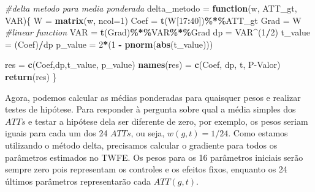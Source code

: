\documentclass[portugues]{article}
\newenvironment{Shaded}{\begin{snugshade}}{\end{snugshade}}
\newcommand{\AttributeTok}[1]{\textcolor[rgb]{0.13,0.29,0.53}{#1}}
\newcommand{\CommentTok}[1]{\textcolor[rgb]{0.56,0.35,0.01}{\textit{#1}}}
\newcommand{\ControlFlowTok}[1]{\textcolor[rgb]{0.13,0.29,0.53}{\textbf{#1}}}
\newcommand{\DecValTok}[1]{\textcolor[rgb]{0.00,0.00,0.81}{#1}}
\newcommand{\FunctionTok}[1]{\textcolor[rgb]{0.13,0.29,0.53}{\textbf{#1}}}
\newcommand{\NormalTok}[1]{#1}
\newcommand{\OtherTok}[1]{\textcolor[rgb]{0.56,0.35,0.01}{#1}}
\newcommand{\SpecialCharTok}[1]{\textcolor[rgb]{0.81,0.36,0.00}{\textbf{#1}}}
\newcommand{\StringTok}[1]{\textcolor[rgb]{0.31,0.60,0.02}{#1}}
\begin{document}
\begin{box_code}

\begin{Shaded}
\begin{Highlighting}[]
\CommentTok{\#delta metodo para media ponderada}
\NormalTok{delta\_metodo }\OtherTok{=} \ControlFlowTok{function}\NormalTok{(w, ATT\_gt, VAR)\{}
\NormalTok{  W }\OtherTok{=} \FunctionTok{matrix}\NormalTok{(w, }\AttributeTok{ncol=}\DecValTok{1}\NormalTok{)}
\NormalTok{  Coef }\OtherTok{=} \FunctionTok{t}\NormalTok{(W[}\DecValTok{17}\SpecialCharTok{:}\DecValTok{40}\NormalTok{])}\SpecialCharTok{\%*\%}\NormalTok{ATT\_gt}
\NormalTok{  Grad }\OtherTok{=}\NormalTok{ W }\CommentTok{\#linear function}
\NormalTok{  VAR }\OtherTok{=} \FunctionTok{t}\NormalTok{(Grad)}\SpecialCharTok{\%*\%}\NormalTok{VAR}\SpecialCharTok{\%*\%}\NormalTok{Grad}
\NormalTok{  dp }\OtherTok{=}\NormalTok{ VAR}\SpecialCharTok{\^{}}\NormalTok{(}\DecValTok{1}\SpecialCharTok{/}\DecValTok{2}\NormalTok{)}
\NormalTok{  t\_value }\OtherTok{=}\NormalTok{ (Coef)}\SpecialCharTok{/}\NormalTok{dp}
\NormalTok{  p\_value }\OtherTok{=} \DecValTok{2}\SpecialCharTok{*}\NormalTok{(}\DecValTok{1} \SpecialCharTok{{-}} \FunctionTok{pnorm}\NormalTok{(}\FunctionTok{abs}\NormalTok{(t\_value)))}
  
\NormalTok{  res }\OtherTok{=} \FunctionTok{c}\NormalTok{(Coef,dp,t\_value, p\_value)}
  \FunctionTok{names}\NormalTok{(res) }\OtherTok{=} \FunctionTok{c}\NormalTok{(}\StringTok{\textquotesingle{}Coef\textquotesingle{}}\NormalTok{, }\StringTok{\textquotesingle{}dp\textquotesingle{}}\NormalTok{, }\StringTok{\textquotesingle{}t\textquotesingle{}}\NormalTok{, }\StringTok{\textquotesingle{}P{-}Valor\textquotesingle{}}\NormalTok{)}
  \FunctionTok{return}\NormalTok{(res)}
\NormalTok{\}}
\end{Highlighting}
\end{Shaded}

\end{box_code}

Agora, podemos calcular as médias ponderadas para quaisquer pesos e realizar testes de hipótese. Para responder à pergunta sobre qual a média simples dos $ATTs$ e testar a hipótese dela ser diferente de zero, por exemplo, os pesos seriam iguais para cada um dos 24 $ATTs$, ou seja, $w(g,t) = 1/24$. Como estamos utilizando o método delta, precisamos calcular o gradiente para todos os parâmetros estimados no TWFE. Os pesos para os 16 parâmetros iniciais serão sempre zero pois representam os controles e os efeitos fixos, enquanto os 24 últimos parâmetros representarão cada $ATT(g,t)$.
\end{document}
